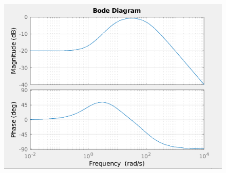 \documentclass[12pt,a4paper]{article}
\begin{document}
	\begin{figure}[h!]
		\centering
		\includegraphics[scale=0.6]{./images/bode43tot.png}
	\end{figure}
	\newpage
\end{document}
